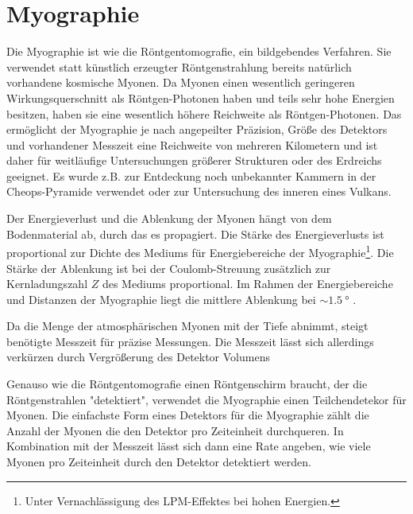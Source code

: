 \section{Myographie}


Die Myographie ist wie die Röntgentomografie, ein bildgebendes Verfahren.
Sie verwendet statt künstlich erzeugter Röntgenstrahlung bereits natürlich vorhandene kosmische Myonen.
Da Myonen einen wesentlich geringeren Wirkungsquerschnitt als Röntgen-Photonen
haben und teils sehr hohe Energien besitzen, haben sie eine wesentlich höhere Reichweite
als Röntgen-Photonen. Das ermöglicht der Myographie je nach 
angepeilter Präzision, Größe des Detektors und vorhandener Messzeit
eine Reichweite von mehreren Kilometern und ist daher
für weitläufige Untersuchungen größerer Strukturen oder des Erdreichs geeignet.
Es wurde z.B. zur Entdeckung noch unbekannter Kammern in der Cheops-Pyramide
verwendet\cite{pyramiden} oder zur Untersuchung des inneren eines Vulkans\cite{TANAKA2007104}.

Der Energieverlust und die Ablenkung der Myonen hängt von dem Bodenmaterial 
ab, durch das es propagiert.
Die Stärke des Energieverlusts ist proportional zur Dichte des 
Mediums für Energiebereiche der Myographie\footnote{Unter Vernachlässigung des LPM-Effektes bei hohen Energien.}.
Die Stärke der Ablenkung ist bei der Coulomb-Streuung zusätzlich zur 
Kernladungszahl $Z$ des Mediums proportional.
Im Rahmen der Energiebereiche und Distanzen der Myographie
liegt die mittlere Ablenkung bei $\sim \SI{1,5}{°}$ \cite{Alexandrov2017}.


Da die Menge der atmosphärischen Myonen mit der Tiefe abnimmt, 
steigt benötigte Messzeit für präzise Messungen.
Die Messzeit lässt sich allerdings verkürzen durch Vergrößerung 
des Detektor Volumens

Genauso wie die Röntgentomografie einen Röntgenschirm braucht, der die Röntgenstrahlen 
"detektiert", verwendet die Myographie einen Teilchendetekor für Myonen.
Die einfachste Form eines Detektors für die Myographie zählt die Anzahl der Myonen die 
den Detektor pro Zeiteinheit durchqueren.
In Kombination mit der Messzeit lässt sich 
dann eine Rate angeben, wie viele Myonen pro Zeiteinheit durch den Detektor detektiert werden.

